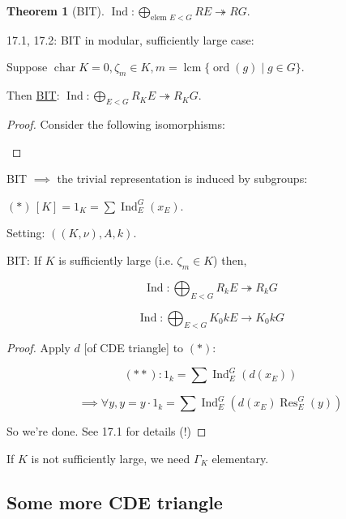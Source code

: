 \documentclass{article}
\theoremstyle{definition}
\newtheorem{theorem}{Theorem}
\begin{document}
\begin{theorem}
    [BIT] \(\operatorname{Ind}: \bigoplus_{\text{elem } E < G} RE \twoheadrightarrow RG\).
\end{theorem}

17.1, 17.2: BIT in modular, sufficiently large case:

Suppose \(\operatorname{char} K = 0, \zeta_m \in K, m = \operatorname{lcm} \{\operatorname{ord}(g) \mid g\in G\}\).

Then \underline{BIT}: \(\operatorname{Ind}\colon  \bigoplus_{E < G} R_K E \twoheadrightarrow R_K G\).

\begin{proof}

    Consider the following isomorphisms:

    \begin{center}
    \end{center}
\end{proof}

BIT \(\implies\) the trivial representation is induced by subgroups:

\((\ast) \, [K] = 1_K = \sum \operatorname{Ind}_E^G (x_E)\).

Setting: \(((K,\nu),A,k)\).

BIT: If \(K\) is sufficiently large (i.e. \(\zeta_m \in K\)) then,

\[
    \operatorname{Ind}: \bigoplus_{E < G} R_k E \twoheadrightarrow R_k G
\]

\[
    \operatorname{Ind}: \bigoplus_{E < G} K_0 k E \to K_0 k G
\]

\begin{proof}
    Apply \(d\) [of CDE triangle] to \((\ast)\):

    \[
        (\ast \ast): 1_k = \sum \operatorname{Ind}_E^G (d(x_E))
    \]

    \[
        \implies \forall y, y = y \cdot 1_k = \sum \operatorname{Ind}_E^G (d(x_E)\operatorname{Res}_E^G (y))
    \]

    So we're done. See 17.1 for details (!)
\end{proof}

If \(K\) is not sufficiently large, we need \(\Gamma_K\) elementary.

\subsection*{Some more CDE triangle}
\end{document}
